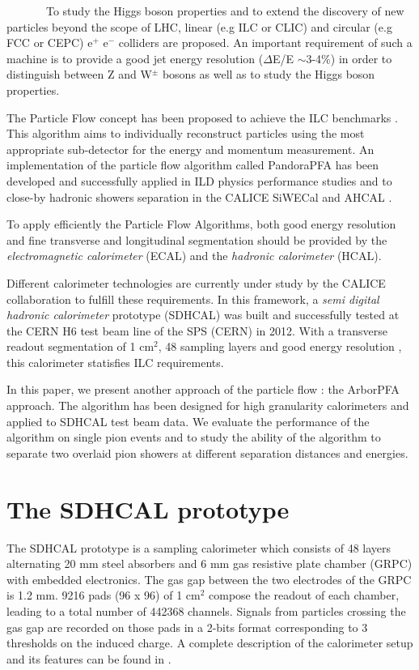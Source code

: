 \documentclass[12pt]{article}
\begin{document}
~~~~~~~To study the Higgs boson properties and to extend the discovery of new particles beyond the scope of LHC, linear (e.g ILC or CLIC) and circular (e.g FCC or CEPC) e$^+$ e$^-$ colliders are proposed. An important requirement of such a machine is to provide a good jet energy resolution ($\Delta$E/E $\sim$3-4\%) in order to distinguish between Z and W$^{\pm}$ bosons as well as to study the Higgs boson properties.

The Particle Flow concept has been proposed to achieve the ILC benchmarks \cite{ilc-tdr}. This algorithm aims to individually reconstruct particles using the most appropriate sub-detector for the energy and momentum measurement. An implementation of the particle flow algorithm called PandoraPFA has been developed \cite{pandora-pfa} and successfully applied in ILD physics performance studies and to close-by hadronic showers separation in the CALICE SiWECal and AHCAL \cite{calice-pandora-paper}.

To apply efficiently the Particle Flow Algorithms, both good energy resolution and fine transverse and longitudinal segmentation should be provided by the \textit{electromagnetic calorimeter} (ECAL) and the \textit{hadronic calorimeter} (HCAL).

Different calorimeter technologies are currently under study by the CALICE collaboration to fulfill these requirements. In this framework, a \textit{semi digital hadronic calorimeter} prototype (SDHCAL) was built \cite{sdhcal-paper} and successfully tested at the CERN H6 test beam line of the SPS (CERN) in 2012. With a transverse readout segmentation of 1 cm$^2$, 48 sampling layers and good energy resolution \cite{sdhcal-paper}, this calorimeter statisfies ILC requirements. 

In this paper, we present another approach of the particle flow : the ArborPFA approach. The algorithm has been designed for high granularity calorimeters and applied to SDHCAL test beam data. We evaluate the performance of the algorithm on single pion events and to study the ability of the algorithm to separate two overlaid pion showers at different separation distances and energies.

\section{The SDHCAL prototype}

The SDHCAL prototype is a sampling calorimeter which consists of 48 layers alternating 20 mm steel absorbers and 6 mm gas resistive plate chamber (GRPC) with embedded electronics. The gas gap between the two electrodes of the GRPC is 1.2 mm. 9216 pads (96 x 96) of 1 cm$^2$ compose the readout of each chamber, leading to a total number of 442368 channels. Signals from particles crossing the gas gap are recorded on those pads in a 2-bits format corresponding to 3 thresholds on the induced charge. A complete description of the calorimeter setup and its features can be found in \cite{sdhcal-paper}. 
\end{document}
